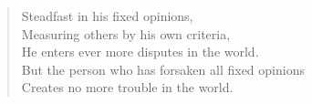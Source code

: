 \begin{verse}
 Steadfast in his fixed opinions,\\
Measuring others by his own criteria,\\
He enters ever more disputes in the world.\\
But the person who has forsaken all fixed opinions\\
Creates no more trouble in the world.


\end{verse}
